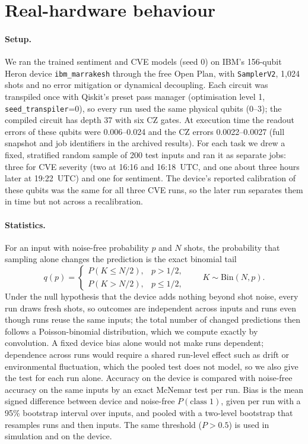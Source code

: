 \documentclass[11pt]{article}
\begin{document}
\section{Real-hardware behaviour}\label{sec:hardware}
\paragraph{Setup.} We ran the trained sentiment and CVE models (seed 0) on IBM's 156-qubit Heron device \texttt{ibm\_marrakesh} through the free Open Plan, with \texttt{SamplerV2}, 1{,}024 shots and no error mitigation or dynamical decoupling. Each circuit was transpiled once with Qiskit's preset pass manager (optimisation level 1, \texttt{seed\_transpiler}=0), so every run used the same physical qubits (0--3); the compiled circuit has depth 37 with six CZ gates. At execution time the readout errors of these qubits were 0.006--0.024 and the CZ errors 0.0022--0.0027 (full snapshot and job identifiers in the archived results). For each task we drew a fixed, stratified random sample of 200 test inputs and ran it as separate jobs: three for CVE severity (two at 16:16 and 16:18~UTC, and one about three hours later at 19:22~UTC) and one for sentiment. The device's reported calibration of these qubits was the same for all three CVE runs, so the later run separates them in time but not across a recalibration.

\paragraph{Statistics.} For an input with noise-free probability $p$ and $N$ shots, the probability that sampling alone changes the prediction is the exact binomial tail
\begin{equation}
q(p) = \begin{cases} P(K \le N/2), & p > 1/2,\\ P(K > N/2), & p \le 1/2,\end{cases}\qquad K \sim \mathrm{Bin}(N, p).
\end{equation}
Under the null hypothesis that the device adds nothing beyond shot noise, every run draws fresh shots, so outcomes are independent across inputs and runs even though runs reuse the same inputs; the total number of changed predictions then follows a Poisson-binomial distribution, which we compute exactly by convolution. A fixed device bias alone would not make runs dependent; dependence across runs would require a shared run-level effect such as drift or environmental fluctuation, which the pooled test does not model, so we also give the test for each run alone. Accuracy on the device is compared with noise-free accuracy on the same inputs by an exact McNemar test per run. Bias is the mean signed difference between device and noise-free $P(\text{class }1)$, given per run with a 95\% bootstrap interval over inputs, and pooled with a two-level bootstrap that resamples runs and then inputs. The same threshold ($P > 0.5$) is used in simulation and on the device.
\end{document}
